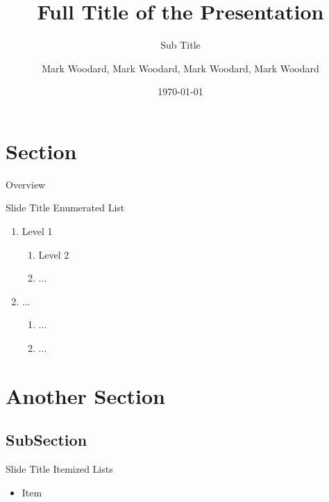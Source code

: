 \usepackage[english] {babel}

\usepackage{amsmath, amsfonts, graphicx}
\usepackage{bibunits, tikz}


\title[Short Title]{Full Title of the Presentation}
\subtitle{Sub Title}
\author[Bruce Wayne]{Mark Woodard, Mark Woodard, Mark Woodard, Mark Woodard}
\date{\today}


\maketitle

\section{Section}
\begin{frame}{Overview}
  \tableofcontents
\end{frame}

\begin{frame}{Slide Title}
  Enumerated List~\cite{ipsum}\pause
  \begin{enumerate}
  \item Level 1
    \begin{enumerate}
    \item Level 2
    \item ...
    \end{enumerate}\pause
  \item ...
    \begin{enumerate}
    \item ...
    \item ...
    \end{enumerate}
  \end{enumerate}
\end{frame}

\section{Another Section}
\subsection{SubSection}
\begin{frame}{Slide Title}
  Itemized Lists~\cite{lorem}
  \begin{itemize}
  \item Item
  \end{itemize}
\end{frame}

